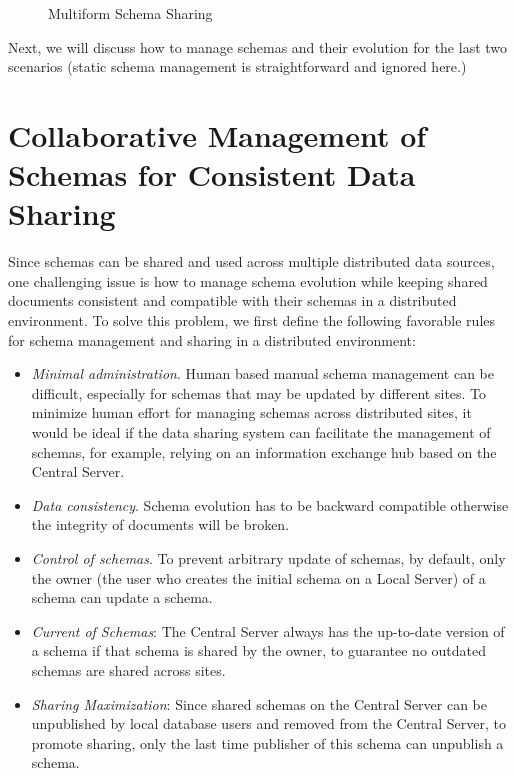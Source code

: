 \documentclass{singlecol-new}
\theoremstyle{TH}{
\newtheorem{lemma}{Lemma}
\newtheorem{theorem}[lemma]{Theorem}
\newtheorem{corrolary}[lemma]{Corrolary}
\newtheorem{conjecture}[lemma]{Conjecture}
\newtheorem{proposition}[lemma]{Proposition}
\newtheorem{claim}[lemma]{Claim}
\newtheorem{stheorem}[lemma]{Wrong Theorem}
\newtheorem{algorithm}{Algorithm}
}
\theoremstyle{THrm}{
\newtheorem{definition}{Definition}[section]
\newtheorem{question}{Question}[section]
\newtheorem{remark}{Remark}
\newtheorem{scheme}{Scheme}
}
\theoremstyle{THhit}{
\newtheorem{case}{Case}[section]
}
\begin{document}
\begin{figure*}[t]%
\caption{Multiform Schema Sharing}
\label{fig:publicdistributedschema}
\end{figure*}

Next, we will discuss how to manage schemas and their evolution for the last
two scenarios (static schema management is straightforward and ignored here.)


\section{Collaborative Management of Schemas for Consistent Data Sharing}
\label{sec:collaborativeschema}

Since schemas can be shared and used across multiple distributed
data sources, one challenging issue is how to manage schema
evolution while keeping shared documents consistent and compatible
with their schemas in a distributed environment. To solve this
problem, we first define the following favorable rules for schema
management and sharing in a distributed environment:
\begin{itemize}

\item {\em Minimal administration}. Human based manual schema
management can be difficult, especially for schemas that may be
updated by different sites.  To minimize human effort for managing
schemas across distributed sites, it would be ideal if the data
sharing system can facilitate the management of schemas, for
example, relying on an information exchange hub  based on the
Central Server.

\item {\em Data consistency}.  Schema evolution has to be backward compatible otherwise the integrity of documents will be broken.

\item {\em Control of schemas}. To prevent arbitrary update of
schemas, by default, only the owner (the user who creates the
initial schema on a Local Server) of a schema can update a schema.

\item {\em Current of Schemas}: The Central Server always has the
up-to-date version of a schema if that schema is shared by the
owner, to guarantee no outdated schemas are shared across sites.

\item {\em Sharing Maximization}: Since shared schemas on the Central
Server can be unpublished by local database users and removed from
the Central Server, to promote sharing, only the last time publisher
of this schema can unpublish a schema.

\end{itemize}
\end{document}

